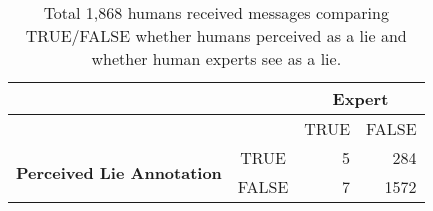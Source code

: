 \begin{table}[t]
\centering
\begin{tabular}{ccrr}
\hline
& &\multicolumn{2}{c}{\textbf{Expert}} \\
\hline
& & TRUE & FALSE \\
\hline
\multirow{ 2}{*}{\textbf{Perceived Lie Annotation}} & TRUE &5 &284 \\
&FALSE &7 & 1572 \\
\hline
\end{tabular}
\caption{Total 1,868 humans received messages comparing TRUE/FALSE whether humans perceived as a lie and whether human experts see as a lie.}
\label{tab:plie_expert}
\end{table}


